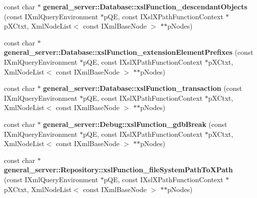 \begin{DoxyCompactItemize}
\item 
\hypertarget{group__XSLModule-Functions_gaab1301b43a6e6453e548dafb113ec0d1}{const char $\ast$ {\bfseries general\-\_\-server\-::\-Database\-::xsl\-Function\-\_\-descendant\-Objects} (const \-I\-Xml\-Query\-Environment $\ast$p\-Q\-E, const \-I\-Xsl\-X\-Path\-Function\-Context $\ast$p\-X\-Ctxt, \-Xml\-Node\-List$<$ const \-I\-Xml\-Base\-Node $>$ $\ast$$\ast$p\-Nodes)}\label{group__XSLModule-Functions_gaab1301b43a6e6453e548dafb113ec0d1}

\item 
\hypertarget{group__XSLModule-Functions_gafd74ad032477d92033656e0e08b160f5}{const char $\ast$ {\bfseries general\-\_\-server\-::\-Database\-::xsl\-Function\-\_\-extension\-Element\-Prefixes} (const \-I\-Xml\-Query\-Environment $\ast$p\-Q\-E, const \-I\-Xsl\-X\-Path\-Function\-Context $\ast$p\-X\-Ctxt, \-Xml\-Node\-List$<$ const \-I\-Xml\-Base\-Node $>$ $\ast$$\ast$p\-Nodes)}\label{group__XSLModule-Functions_gafd74ad032477d92033656e0e08b160f5}

\item 
\hypertarget{group__XSLModule-Functions_ga280b7fac71183e9ed14892316504558e}{const char $\ast$ {\bfseries general\-\_\-server\-::\-Database\-::xsl\-Function\-\_\-transaction} (const \-I\-Xml\-Query\-Environment $\ast$p\-Q\-E, const \-I\-Xsl\-X\-Path\-Function\-Context $\ast$p\-X\-Ctxt, \-Xml\-Node\-List$<$ const \-I\-Xml\-Base\-Node $>$ $\ast$$\ast$p\-Nodes)}\label{group__XSLModule-Functions_ga280b7fac71183e9ed14892316504558e}

\item 
\hypertarget{group__XSLModule-Functions_ga94f9bcb82655217ac57900eac1501907}{const char $\ast$ {\bfseries general\-\_\-server\-::\-Debug\-::xsl\-Function\-\_\-gdb\-Break} (const \-I\-Xml\-Query\-Environment $\ast$p\-Q\-E, const \-I\-Xsl\-X\-Path\-Function\-Context $\ast$p\-X\-Ctxt, \-Xml\-Node\-List$<$ const \-I\-Xml\-Base\-Node $>$ $\ast$$\ast$p\-Nodes)}\label{group__XSLModule-Functions_ga94f9bcb82655217ac57900eac1501907}

\item 
\hypertarget{group__XSLModule-Functions_gaffd1f822af85c5fc69654c77c2e5f6e2}{const char $\ast$ {\bfseries general\-\_\-server\-::\-Repository\-::xsl\-Function\-\_\-file\-System\-Path\-To\-X\-Path} (const \-I\-Xml\-Query\-Environment $\ast$p\-Q\-E, const \-I\-Xsl\-X\-Path\-Function\-Context $\ast$p\-X\-Ctxt, \-Xml\-Node\-List$<$ const \-I\-Xml\-Base\-Node $>$ $\ast$$\ast$p\-Nodes)}\label{group__XSLModule-Functions_gaffd1f822af85c5fc69654c77c2e5f6e2}


\end{DoxyCompactItemize}
